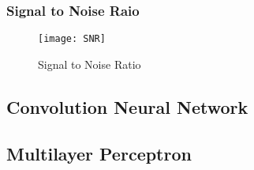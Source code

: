 \documentclass[
	article, %
	11pt, %
]{CSUniSchoolLabReport}
\begin{document}
\subsubsection{Signal to Noise Raio}\label{sur_visual}

\begin{figure}[H] %
	\centering %
	\texttt{[image: SNR]} %
	\caption{Signal to Noise Ratio}\label{fig:snr}
\end{figure}


\subsection{Convolution Neural Network}\label{cnn_visual}

\subsection{Multilayer Perceptron}\label{mlp_visual}










\end{document}
